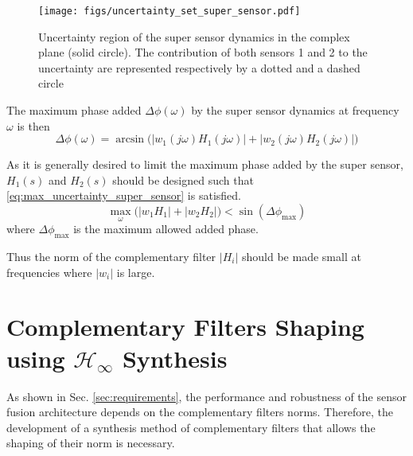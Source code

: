 \documentclass[letterpaper, 10 pt, conference]{ieeeconf}
\begin{document}
\begin{figure}[htbp]
\centering
\texttt{[image: figs/uncertainty\_set\_super\_sensor.pdf]}
\caption{\label{fig:uncertainty_set_super_sensor}
Uncertainty region of the super sensor dynamics in the complex plane (solid circle). The contribution of both sensors 1 and 2 to the uncertainty are represented respectively by a dotted and a dashed circle}
\end{figure}

The maximum phase added \(\Delta\phi(\omega)\) by the super sensor dynamics at frequency \(\omega\) is then
\begin{equation}
\label{eq:max_phase_uncertainty}
    \Delta\phi(\omega) = \arcsin\big( |w_1(j\omega) H_1(j\omega)| + |w_2(j\omega) H_2(j\omega)| \big)
\end{equation}

As it is generally desired to limit the maximum phase added by the super sensor, \(H_1(s)\) and \(H_2(s)\) should be designed such that \eqref{eq:max_uncertainty_super_sensor} is satisfied.
\begin{equation}
\label{eq:max_uncertainty_super_sensor}
   \max_\omega \big( \left|w_1 H_1\right| + \left|w_2 H_2\right|\big) < \sin\left( \Delta \phi_\text{max} \right)
\end{equation}
where \(\Delta \phi_\text{max}\) is the maximum allowed added phase.

Thus the norm of the complementary filter \(|H_i|\) should be made small at frequencies where \(|w_i|\) is large.

\section{Complementary Filters Shaping using \(\mathcal{H}_\infty\) Synthesis}
\label{sec:org81f8565}
\label{sec:hinf_method}
As shown in Sec. \ref{sec:requirements}, the performance and robustness of the sensor fusion architecture depends on the complementary filters norms.
Therefore, the development of a synthesis method of complementary filters that allows the shaping of their norm is necessary.
\end{document}
